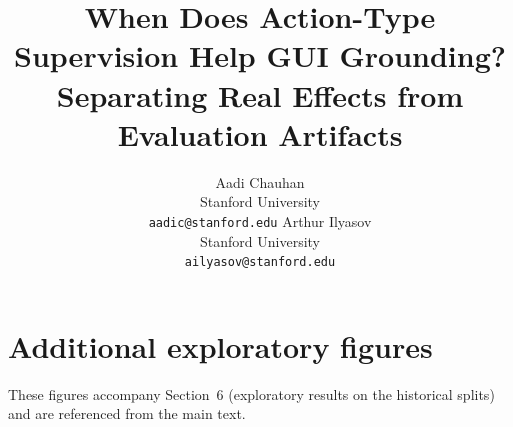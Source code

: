 \documentclass{article}
\title{When Does Action-Type Supervision Help GUI Grounding?\\
Separating Real Effects from Evaluation Artifacts}
\author{%
  Aadi Chauhan\\
  Stanford University\\
  \texttt{aadic@stanford.edu}
  \And
  Arthur Ilyasov\\
  Stanford University\\
  \texttt{ailyasov@stanford.edu}
}
\begin{document}
\maketitle






\appendix
\section{Additional exploratory figures}
These figures accompany Section~6 (exploratory results on the historical
splits) and are referenced from the main text.
\figexpablation
\figexpscaling
\figexpattention
\end{document}
